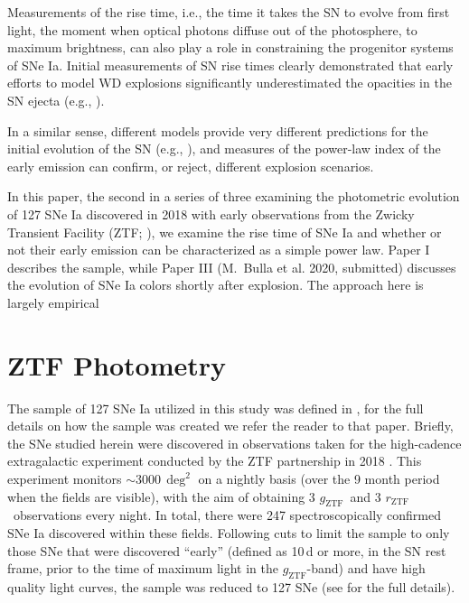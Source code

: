 \documentclass[twocolumn]{./aastex63}
\newcommand{\rztf}{$r_\mathrm{ZTF}$}
\newcommand{\gztf}{$g_\mathrm{ZTF}$}
\begin{document}
Measurements of the rise time, i.e., the time it takes the SN to evolve from
first light, the moment when optical photons diffuse out of the photosphere, to
maximum brightness, can also play a role in constraining the progenitor systems
of SNe Ia. Initial measurements of SN rise times clearly demonstrated that early
efforts to model WD explosions significantly underestimated the opacities in the
SN ejecta (e.g., \citealt{Riess99a}).


In a similar sense, different models provide very different predictions for the initial evolution of the SN (e.g., \citealt{Noebauer17}), and measures of the power-law index of the early emission can confirm, or reject, different explosion scenarios. 




In this paper, the second in a series of three examining the photometric evolution of 127 SNe Ia discovered in 2018 with early observations from the Zwicky Transient Facility (ZTF; \citealt{}), we examine the rise time of SNe Ia and whether or not their early emission can be characterized as a simple power law. Paper I \citep{Yao19} describes the sample, while Paper III (M.\ Bulla et al. 2020, submitted) discusses the evolution of SNe Ia colors shortly after explosion. The approach here is largely empirical

\section{ZTF Photometry}

The sample of 127 SNe Ia utilized in this study was defined in \citet{Yao19},
for the full details on how the sample was created we refer the reader to
that paper. Briefly, the SNe studied herein were discovered in observations
taken for the high-cadence extragalactic experiment conducted by the ZTF
partnership in 2018 \citep{Bellm19a}. This experiment monitors
$\sim$3000\,$\deg^2$ on a nightly basis (over the 9 month period when the
fields are visible), with the aim of obtaining 3 \gztf\ and 3 \rztf\
observations every night. In total, there were 247 spectroscopically
confirmed SNe Ia discovered within these fields. Following cuts to limit the
sample to only those SNe that were discovered ``early'' (defined as 10\,d or
more, in the SN rest frame, prior to the time of maximum light in the
\gztf-band) and have high quality light curves, the sample was reduced to 127
SNe (see \citealt{Yao19} for the full details).
\end{document}
